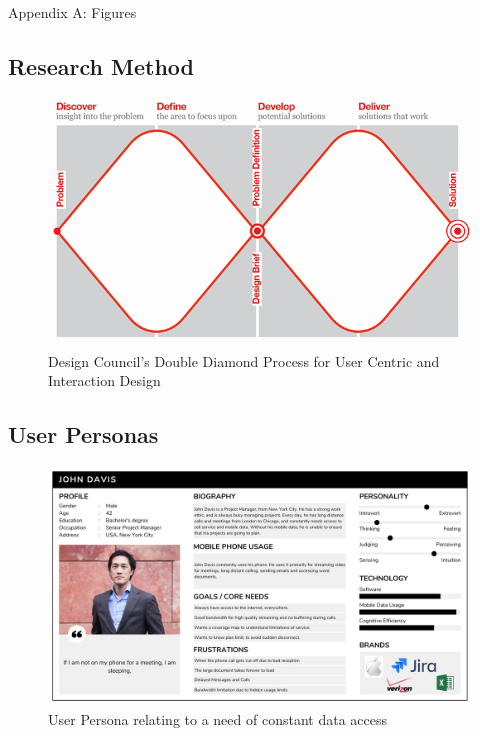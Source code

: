 \documentclass[conference]{IEEEtran}
\begin{document}
\appendix
Appendix A: Figures
\subsection{Research Method}
\begin{figure}[H]
    \centering
    \includegraphics[width=0.8\linewidth]{image.png}
    \caption{Design Council's Double Diamond Process for User Centric and Interaction Design}
    \label{fig:Design Council's Double Diamond}
\end{figure}

\subsection{User Personas}
\begin{figure}[H]
    \centering
    \includegraphics[width=1\linewidth]{persona_johndavis.png}
    \caption{User Persona relating to a need of constant data access}
    \label{fig:user persona 1}
\end{figure}
\end{document}
